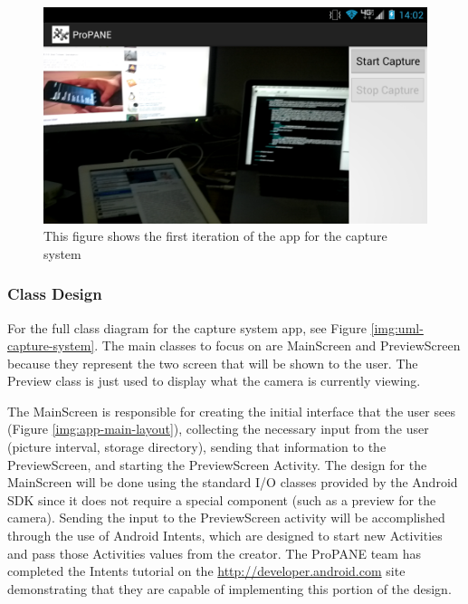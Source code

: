 \documentclass[]{article}
\begin{document}
					\begin{figure}
						\centering
						\includegraphics[scale=0.4]{images/screenshot-app-preview.png}
						\caption{This figure shows the first iteration of the app for the capture system}
						\label{img:screenshot-app-preview}
					\end{figure}
					
					
					
				\subsubsection{Class Design}
					For the full class diagram for the capture system app, see Figure \ref{img:uml-capture-system}. The main classes to focus on are MainScreen and PreviewScreen because they represent the two screen that will be shown to the user. The Preview class is just used to display what the camera is currently viewing.
					
					The MainScreen is responsible for creating the initial interface that the user sees (Figure \ref{img:app-main-layout}), collecting the necessary input from the user (picture interval, storage directory), sending that information to the PreviewScreen, and starting the PreviewScreen Activity. The design for the MainScreen will be done using the standard I/O classes provided by the Android SDK since it does not require a special component (such as a preview for the camera). Sending the input to the PreviewScreen activity will be accomplished through the use of Android Intents, which are designed to start new Activities and pass those Activities values from the creator. The ProPANE team has completed the Intents tutorial on the \url{http://developer.android.com} site demonstrating that they are capable of implementing this portion of the design. 
					
\end{document}
